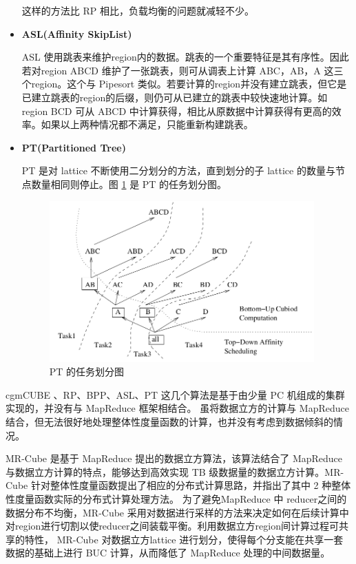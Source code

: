 \begin{itemize}
这样的方法比 RP 相比，负载均衡的问题就减轻不少。

\item \textbf{ASL(Affinity SkipList)}

ASL 使用跳表来维护region内的数据。跳表的一个重要特征是其有序性。因此若对region ABCD 维护了一张跳表，则可从调表上计算 ABC，AB，A 这三个region。这个与 Pipesort 类似。若要计算的region并没有建立跳表，但它是已建立跳表的region的后缀，则仍可从已建立的跳表中较快速地计算。如region BCD 可从 ABCD 中计算获得，相比从原数据中计算获得有更高的效率。如果以上两种情况都不满足，只能重新构建跳表。
 
\item \textbf{PT(Partitioned Tree)}

PT 是对 lattice 不断使用二分划分的方法，直到划分的子 lattice 的数量与节点数量相同则停止。图 \ref{cluster_pt} 是 PT 的任务划分图。

\begin{figure}[!htb]
\centering\includegraphics[width=4in]{picture/ch_current_research/cluster_pt} 
\caption{PT 的任务划分图}\label{cluster_pt} 
\end{figure} 

\end{itemize}


cgmCUBE \cite{dehne2006cgmcube}、RP、BPP、ASL、PT \cite{ng2001iceberg} 这几个算法是基于由少量 PC 机组成的集群实现的，并没有与 MapReduce 框架相结合。 \cite{you2008parallel} \cite{sergey2009applying} \cite{lee2012efficient} 虽将数据立方的计算与 MapReduce结合，但无法很好地处理整体性度量函数的计算，也并没有考虑到数据倾斜的情况。

MR-Cube \cite{nandi2011distributed} 是基于 MapReduce 提出的数据立方算法，该算法结合了 MapReduce 与数据立方计算的特点，能够达到高效实现 TB 级数据量的数据立方计算。MR-Cube 针对整体性度量函数提出了相应的分布式计算思路，并指出了其中 2 种整体性度量函数实际的分布式计算处理方法。 为了避免MapReduce 中 reducer之间的数据分布不均衡，MR-Cube 采用对数据进行采样的方法来决定如何在后续计算中对region进行切割以使reducer之间装载平衡。利用数据立方region间计算过程可共享的特性， MR-Cube 对数据立方lattice 进行划分，使得每个分支能在共享一套数据的基础上进行 BUC 计算，从而降低了 MapReduce 处理的中间数据量。

